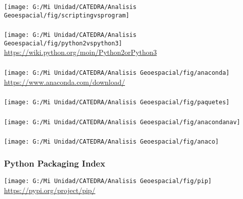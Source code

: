 \documentclass[12pt]{beamer}
\begin{document}
\begin{frame}
\frametitle{}
\centering
	\texttt{[image: G:/Mi Unidad/CATEDRA/Analisis Geoespacial/fig/scriptingvsprogram]} 
\end{frame}
\begin{frame}
\frametitle{}
\centering
	\texttt{[image: G:/Mi Unidad/CATEDRA/Analisis Geoespacial/fig/python2vspython3]}
\vfill
\url{https://wiki.python.org/moin/Python2orPython3}
\end{frame}
\begin{frame}
\frametitle{}
\centering
	\texttt{[image: G:/Mi Unidad/CATEDRA/Analisis Geoespacial/fig/anaconda]}
\vfill
\url{https://www.anaconda.com/download/}
\end{frame}
\begin{frame}
\frametitle{}
\centering
	\texttt{[image: G:/Mi Unidad/CATEDRA/Analisis Geoespacial/fig/paquetes]}
\end{frame}
\begin{frame}
\frametitle{}
\centering
	\texttt{[image: G:/Mi Unidad/CATEDRA/Analisis Geoespacial/fig/anacondanav]}
\end{frame}
\begin{frame}
\frametitle{}
\centering
	\texttt{[image: G:/Mi Unidad/CATEDRA/Analisis Geoespacial/fig/anaco]}
\end{frame}
\begin{frame}
 \begin{center}
    \end{center}
\end{frame}
\begin{frame}
\frametitle{Python Packaging Index}
\centering
	\texttt{[image: G:/Mi Unidad/CATEDRA/Analisis Geoespacial/fig/pip]}
\vfill
\url{https://pypi.org/project/pip/}
\end{frame}
\end{document}
